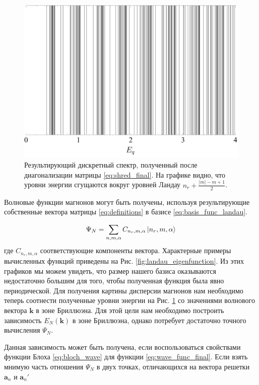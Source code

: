 \documentclass[a4paper,article,14pt]{extarticle}
\begin{document}
\begin{figure}[t]
\centering	
\includegraphics[width=0.95\columnwidth]{images/spectrum_landau.pdf}
\caption{Результирующий дискретный спектр, полученный после диагонализации матрицы \eqref{eq:shred_final}. На графике видно, что уровни энергии сгущаются вокруг уровней Ландау $n_r + \frac{|m| - m + 1}{2}$. }
\label{fig:landau_spectrum}
\end{figure}

Волновые функции магнонов могут быть получены, используя результирующие собственные вектора матрицы \eqref{eq:definitions} в базисе \eqref{eq:basis_func_landau}.

\begin{equation}
\label{eq:wave_func_final}
\Psi_N = \sum_{n,m,\alpha} C_{n_r, m, \alpha} \ket{n_r, m, \alpha}
\end{equation}
где $C_{n_r, m, \alpha}$ соответствующие компоненты вектора.
Характерные примеры вычисленных функций приведены на Рис. \ref{fig:landau_eigenfunction}. Из этих графиков мы можем увидеть, что размер нашего базиса оказываются недостаточно большим для того, чтобы полученная функция была явно периодической. Для получения картины дисперсии магнонов\cite{garst_2017, roldan} нам необходимо теперь соотнести полученные уровни энергии на Рис. \ref{fig:landau_spectrum}  со значениями волнового вектора $\mathbf{k}$ в зоне Бриллюэна. Для этой цели нам необходимо построить зависимость $E_N(\mathbf{k})$ в зоне Бриллюэна, однако потребует достаточно точного вычисления $\Psi_N$.

Данная зависимость может быть получена, если воспользоваться свойствами функции Блоха \eqref{eq:bloch_wave} для функции \eqref{eq:wave_func_final}. Если взять мнимую часть отношения $\Psi_N$ в двух точках, отличающихся на вектора решетки $\mathbf{a}_n$ и $\mathbf{a}_n'$
\end{document}
